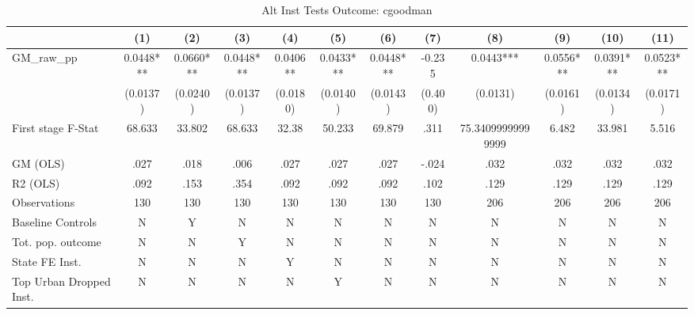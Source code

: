 \begin{table}[htbp]\centering
\def\sym#1{\ifmmode^{#1}\else\(^{#1}\)\fi}
\caption{Alt Inst Tests Outcome: cgoodman}
\begin{tabular}{l*{11}{c}}
\toprule
            &\multicolumn{1}{c}{(1)}   &\multicolumn{1}{c}{(2)}   &\multicolumn{1}{c}{(3)}   &\multicolumn{1}{c}{(4)}   &\multicolumn{1}{c}{(5)}   &\multicolumn{1}{c}{(6)}   &\multicolumn{1}{c}{(7)}   &\multicolumn{1}{c}{(8)}   &\multicolumn{1}{c}{(9)}   &\multicolumn{1}{c}{(10)}   &\multicolumn{1}{c}{(11)}   \\
\midrule
GM\_raw\_pp   &   0.0448***&   0.0660***&   0.0448***&   0.0406** &   0.0433***&   0.0448***&   -0.235   &   0.0443***&   0.0556***&   0.0391***&   0.0523***\\
            & (0.0137)   & (0.0240)   & (0.0137)   & (0.0180)   & (0.0140)   & (0.0143)   &  (0.400)   & (0.0131)   & (0.0161)   & (0.0134)   & (0.0171)   \\
\midrule
First stage F-Stat&   68.633   &   33.802   &   68.633   &    32.38   &   50.233   &   69.879   &     .311   &75.34099999999999   &    6.482   &   33.981   &    5.516   \\
GM (OLS)    &     .027   &     .018   &     .006   &     .027   &     .027   &     .027   &    -.024   &     .032   &     .032   &     .032   &     .032   \\
R2 (OLS)    &     .092   &     .153   &     .354   &     .092   &     .092   &     .092   &     .102   &     .129   &     .129   &     .129   &     .129   \\
Observations&      130   &      130   &      130   &      130   &      130   &      130   &      130   &      206   &      206   &      206   &      206   \\
Baseline Controls&        N   &        Y   &        N   &        N   &        N   &        N   &        N   &        N   &        N   &        N   &        N   \\
Tot. pop. outcome&        N   &        N   &        Y   &        N   &        N   &        N   &        N   &        N   &        N   &        N   &        N   \\
State FE Inst.&        N   &        N   &        N   &        Y   &        N   &        N   &        N   &        N   &        N   &        N   &        N   \\
Top Urban Dropped Inst.&        N   &        N   &        N   &        N   &        Y   &        N   &        N   &        N   &        N   &        N   &        N   \\

\end{tabular}
\end{table}
